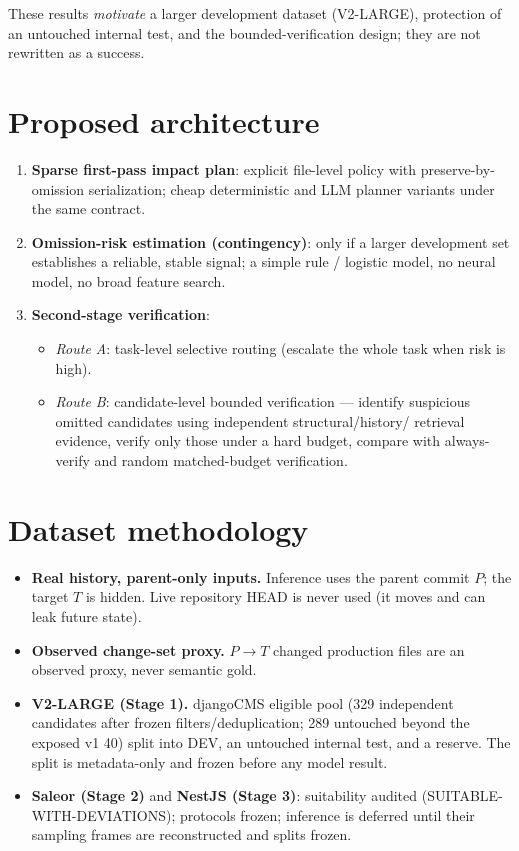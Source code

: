\documentclass[11pt,a4paper]{article}
\begin{document}
These results \emph{motivate} a larger development dataset (V2-LARGE),
protection of an untouched internal test, and the bounded-verification design;
they are not rewritten as a success.

\section{Proposed architecture}
\label{sec:architecture}

\begin{enumerate}
  \item \textbf{Sparse first-pass impact plan}: explicit file-level policy with
  preserve-by-omission serialization; cheap deterministic and LLM planner
  variants under the same contract.
  \item \textbf{Omission-risk estimation (contingency)}: only if a larger
  development set establishes a reliable, stable signal; a simple rule /
  logistic model, no neural model, no broad feature search.
  \item \textbf{Second-stage verification}:
    \begin{itemize}
      \item \emph{Route A}: task-level selective routing (escalate the whole
      task when risk is high).
      \item \emph{Route B}: candidate-level bounded verification --- identify
      suspicious omitted candidates using independent structural/history/
      retrieval evidence, verify only those under a hard budget, compare with
      always-verify and random matched-budget verification.
    \end{itemize}
\end{enumerate}

\section{Dataset methodology}
\label{sec:dataset}

\begin{itemize}
  \item \textbf{Real history, parent-only inputs.} Inference uses the parent
  commit $P$; the target $T$ is hidden. Live repository HEAD is never used
  (it moves and can leak future state).
  \item \textbf{Observed change-set proxy.} $P\!\to\!T$ changed production
  files are an observed proxy, never semantic gold.
  \item \textbf{V2-LARGE (Stage 1).} djangoCMS eligible pool (329 independent
  candidates after frozen filters/deduplication; 289 untouched beyond the
  exposed v1 40) split into DEV, an untouched internal test, and a reserve.
  The split is metadata-only and frozen before any model result.
  \item \textbf{Saleor (Stage 2)} and \textbf{NestJS (Stage 3)}: suitability
  audited (SUITABLE-WITH-DEVIATIONS); protocols frozen; inference is deferred
  until their sampling frames are reconstructed and splits frozen.
\end{itemize}
\end{document}
